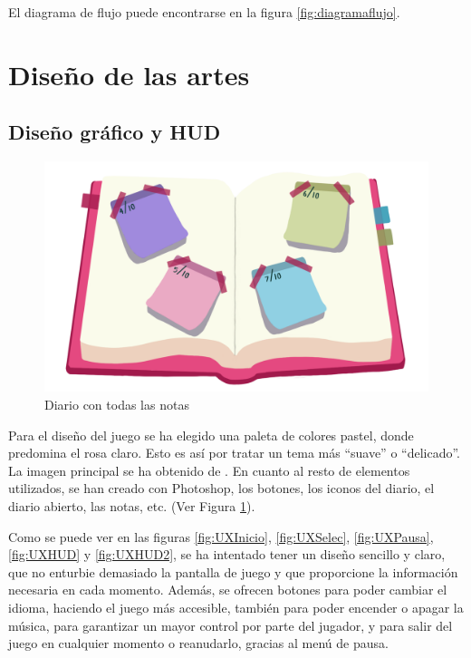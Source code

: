 \documentclass[12pt, a4paper,twoside,titlepage]{book}
\begin{document}
El diagrama de flujo puede encontrarse en la figura \ref{fig:diagramaflujo}.





\section{Diseño de las artes}
\label{sec:diseñoArtes}
\subsection{Diseño gráfico y HUD}

\begin{figure}
	\centering
	\includegraphics[width=.8\linewidth]{TGF/Artes/diarioNotas.png}
	\caption{Diario con todas las notas}
	\label{fig:diarioNotas}
\end{figure}

Para el diseño del juego se ha elegido una paleta de colores pastel, donde predomina el rosa claro. Esto es así por tratar un tema más ``suave'' o ``delicado''. La imagen principal se ha obtenido de \cite{imgInicio}. En cuanto al resto de elementos utilizados, se han creado con Photoshop, los botones, los iconos del diario, el diario abierto, las notas, etc. (Ver Figura \ref{fig:diarioNotas}). 

Como se puede ver en las figuras \ref{fig:UXInicio}, \ref{fig:UXSelec}, \ref{fig:UXPausa}, \ref{fig:UXHUD} y \ref{fig:UXHUD2}, se ha intentado tener un diseño sencillo y claro, que no enturbie demasiado la pantalla de juego y que proporcione la información necesaria en cada momento. Además, se ofrecen botones para poder cambiar el idioma, haciendo el juego más accesible, también para poder encender o apagar la música, para garantizar un mayor control por parte del jugador, y para salir del juego en cualquier momento o reanudarlo, gracias al menú de pausa. 
\end{document}
